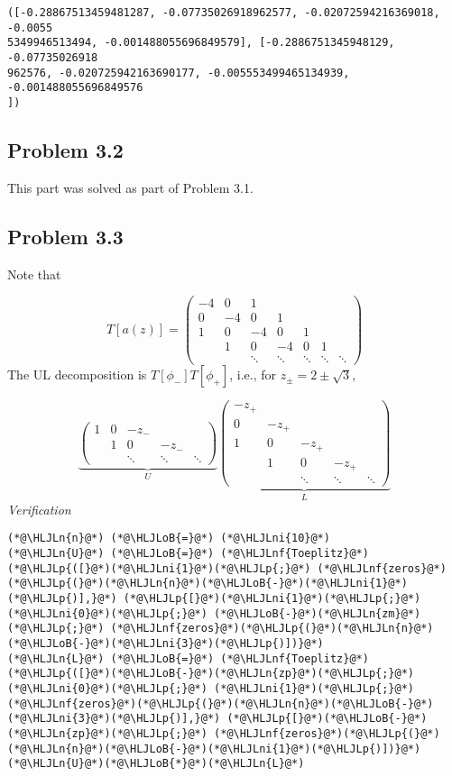 \documentclass[12pt,landscape]{article}
\newcommand{\HLJLn}[1]{#1}
\newcommand{\HLJLnf}[1]{\textcolor[RGB]{66,102,213}{#1}}
\newcommand{\HLJLni}[1]{\textcolor[RGB]{59,151,46}{#1}}
\newcommand{\HLJLoB}[1]{\textcolor[RGB]{102,102,102}{\textbf{#1}}}
\newcommand{\HLJLp}[1]{#1}
\def\sopmatrix#1{ \begin{pmatrix}#1\end{pmatrix} }
\begin{document}
{\begin{lstlisting}
([-0.28867513459481287, -0.07735026918962577, -0.02072594216369018, -0.0055
5349946513494, -0.001488055696849579], [-0.2886751345948129, -0.07735026918
962576, -0.020725942163690177, -0.005553499465134939, -0.001488055696849576
])
\end{lstlisting}


\subsection{Problem 3.2}
This part was solved as part of Problem 3.1.

\subsection{Problem 3.3}
Note that

\[
T[a(z)] = \sopmatrix{
-4 & 0 & 1 \\
0 & -4 & 0 & 1 \\
1 & 0 & -4 & 0 & 1 \\
& 1& 0 & -4 & 0 & 1 \\
&&\ddots &\ddots &\ddots &\ddots &\ddots
}
\]
The UL decomposition is $T[\phi_-] T[\phi_+]$, i.e., for $z_{\pm} = 2 \pm \sqrt3$,

\[
\underbrace{\sopmatrix{
1 & 0 & -z_- \\
& 1 & 0 & -z_- \\
&&\ddots & \ddots & \ddots
}}_U
\underbrace{\sopmatrix{-z_+ \\
0 & -z_+ \\
1 & 0 & -z_+ \\
& 1 & 0 & -z_+ \\
&&\ddots & \ddots & \ddots
}}_L
\]
\emph{Verification}


\begin{lstlisting}
(*@\HLJLn{n}@*) (*@\HLJLoB{=}@*) (*@\HLJLni{10}@*)
(*@\HLJLn{U}@*) (*@\HLJLoB{=}@*) (*@\HLJLnf{Toeplitz}@*)(*@\HLJLp{([}@*)(*@\HLJLni{1}@*)(*@\HLJLp{;}@*) (*@\HLJLnf{zeros}@*)(*@\HLJLp{(}@*)(*@\HLJLn{n}@*)(*@\HLJLoB{-}@*)(*@\HLJLni{1}@*)(*@\HLJLp{)],}@*) (*@\HLJLp{[}@*)(*@\HLJLni{1}@*)(*@\HLJLp{;}@*) (*@\HLJLni{0}@*)(*@\HLJLp{;}@*) (*@\HLJLoB{-}@*)(*@\HLJLn{zm}@*)(*@\HLJLp{;}@*) (*@\HLJLnf{zeros}@*)(*@\HLJLp{(}@*)(*@\HLJLn{n}@*)(*@\HLJLoB{-}@*)(*@\HLJLni{3}@*)(*@\HLJLp{)])}@*)
(*@\HLJLn{L}@*) (*@\HLJLoB{=}@*) (*@\HLJLnf{Toeplitz}@*)(*@\HLJLp{([}@*)(*@\HLJLoB{-}@*)(*@\HLJLn{zp}@*)(*@\HLJLp{;}@*) (*@\HLJLni{0}@*)(*@\HLJLp{;}@*) (*@\HLJLni{1}@*)(*@\HLJLp{;}@*) (*@\HLJLnf{zeros}@*)(*@\HLJLp{(}@*)(*@\HLJLn{n}@*)(*@\HLJLoB{-}@*)(*@\HLJLni{3}@*)(*@\HLJLp{)],}@*) (*@\HLJLp{[}@*)(*@\HLJLoB{-}@*)(*@\HLJLn{zp}@*)(*@\HLJLp{;}@*) (*@\HLJLnf{zeros}@*)(*@\HLJLp{(}@*)(*@\HLJLn{n}@*)(*@\HLJLoB{-}@*)(*@\HLJLni{1}@*)(*@\HLJLp{)])}@*)
(*@\HLJLn{U}@*)(*@\HLJLoB{*}@*)(*@\HLJLn{L}@*)
\end{lstlisting}

}
\end{document}

